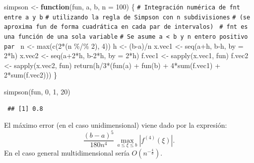 \documentclass[
  10pt,
]{book}
\newenvironment{Shaded}{\begin{snugshade}}{\end{snugshade}}
\newcommand{\AttributeTok}[1]{\textcolor[rgb]{0.77,0.63,0.00}{#1}}
\newcommand{\CommentTok}[1]{\textcolor[rgb]{0.56,0.35,0.01}{\textit{#1}}}
\newcommand{\ControlFlowTok}[1]{\textcolor[rgb]{0.13,0.29,0.53}{\textbf{#1}}}
\newcommand{\DecValTok}[1]{\textcolor[rgb]{0.00,0.00,0.81}{#1}}
\newcommand{\FunctionTok}[1]{\textcolor[rgb]{0.00,0.00,0.00}{#1}}
\newcommand{\NormalTok}[1]{#1}
\newcommand{\OtherTok}[1]{\textcolor[rgb]{0.56,0.35,0.01}{#1}}
\newcommand{\SpecialCharTok}[1]{\textcolor[rgb]{0.00,0.00,0.00}{#1}}
\theoremstyle{break}
\theoremstyle{nonumberplain}
\renewcommand{\CommentTok}[1]{\textcolor[rgb]{0.41,0.41,0.41}{\texttt{#1}}}
\begin{document}
\begin{Shaded}
\begin{Highlighting}[]
\NormalTok{simpson }\OtherTok{\textless{}{-}} \ControlFlowTok{function}\NormalTok{(fun, a, b, }\AttributeTok{n =} \DecValTok{100}\NormalTok{) \{ }
\CommentTok{\# Integración numérica de fnt entre a y b}
\CommentTok{\# utilizando la regla de Simpson con n subdivisiones}
\CommentTok{\# (se aproxima fun de forma cuadrática en cada par de intervalos)  }
\CommentTok{\# fnt es una función de una sola variable}
\CommentTok{\# Se asume a \textless{} b y n entero positivo par }
\NormalTok{  n }\OtherTok{\textless{}{-}} \FunctionTok{max}\NormalTok{(}\FunctionTok{c}\NormalTok{(}\DecValTok{2}\SpecialCharTok{*}\NormalTok{(n }\SpecialCharTok{\%/\%} \DecValTok{2}\NormalTok{), }\DecValTok{4}\NormalTok{))}
\NormalTok{  h }\OtherTok{\textless{}{-}}\NormalTok{ (b}\SpecialCharTok{{-}}\NormalTok{a)}\SpecialCharTok{/}\NormalTok{n}
\NormalTok{  x.vec1 }\OtherTok{\textless{}{-}} \FunctionTok{seq}\NormalTok{(a}\SpecialCharTok{+}\NormalTok{h, b}\SpecialCharTok{{-}}\NormalTok{h, }\AttributeTok{by =} \DecValTok{2}\SpecialCharTok{*}\NormalTok{h)}
\NormalTok{  x.vec2 }\OtherTok{\textless{}{-}} \FunctionTok{seq}\NormalTok{(a}\SpecialCharTok{+}\DecValTok{2}\SpecialCharTok{*}\NormalTok{h, b}\DecValTok{{-}2}\SpecialCharTok{*}\NormalTok{h, }\AttributeTok{by =} \DecValTok{2}\SpecialCharTok{*}\NormalTok{h)}
\NormalTok{  f.vec1 }\OtherTok{\textless{}{-}} \FunctionTok{sapply}\NormalTok{(x.vec1, fun)}
\NormalTok{  f.vec2 }\OtherTok{\textless{}{-}} \FunctionTok{sapply}\NormalTok{(x.vec2, fun)}
  \FunctionTok{return}\NormalTok{(h}\SpecialCharTok{/}\DecValTok{3}\SpecialCharTok{*}\NormalTok{(}\FunctionTok{fun}\NormalTok{(a) }\SpecialCharTok{+} \FunctionTok{fun}\NormalTok{(b) }\SpecialCharTok{+} \DecValTok{4}\SpecialCharTok{*}\FunctionTok{sum}\NormalTok{(f.vec1) }\SpecialCharTok{+} \DecValTok{2}\SpecialCharTok{*}\FunctionTok{sum}\NormalTok{(f.vec2)))}
\NormalTok{\}}

\FunctionTok{simpson}\NormalTok{(fun, }\DecValTok{0}\NormalTok{, }\DecValTok{1}\NormalTok{, }\DecValTok{20}\NormalTok{)}
\end{Highlighting}
\end{Shaded}

\begin{verbatim}
 ## [1] 0.8
\end{verbatim}

El máximo error (en el caso unidimensional) viene dado por la expresión:
\[\frac{(b-a)^5}{180n^4}\,\max_{a\leq \xi \leq b}\left| f^{(4)}(\xi) \right|.\]
En el caso general multidimensional sería \(O(n^{-\frac{4}{d}})\).
\end{document}

